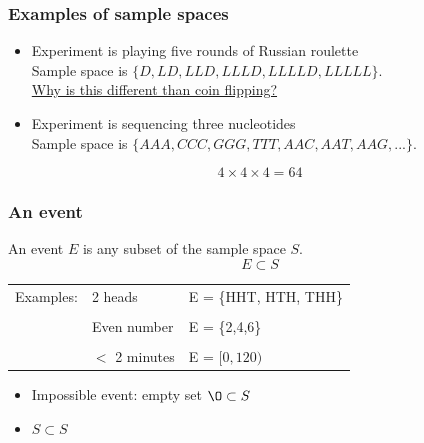 \documentclass[slidestop,compress,mathserif]{beamer}
\begin{document}
\begin{frame}\frametitle{Examples of sample spaces}


\begin{itemize}
\item Experiment is playing five rounds of Russian roulette\\
  Sample space is $\{D,LD,LLD,LLLD,LLLLD, LLLLL\}$. \\
  \vspace{0.3cm}
  \underline{Why is this different than coin flipping?}
  \vspace{1cm}
\pause
\item Experiment is sequencing three nucleotides\\
Sample space is $\{AAA,CCC,GGG,TTT,AAC,AAT,AAG,...\}$. \\
\pause
{}
\end{itemize}
\pause
\[ 4 \times 4 \times 4 = 64\]

\end{frame}

\begin{frame}\frametitle{An event}

\begin{defn}
An event $E$ is any subset of the sample space $S$.
\[E \subset S\]
\end{defn}

\pause
\begin{tabular}{lll}
Examples: & 2 heads 			& E = \{HHT, HTH, THH\} 	\\
			&&\\
                    & Even number        & E = \{2,4,6\}   			\\
			&&\\
                    & $<$ 2 minutes    	& E = $[0,120)	$			\\
\end{tabular}

\pause
\begin{itemize}
\item Impossible event: empty set $\O \subset S$
\item $S \subset S$
\end{itemize}

\end{frame}
\end{document}
